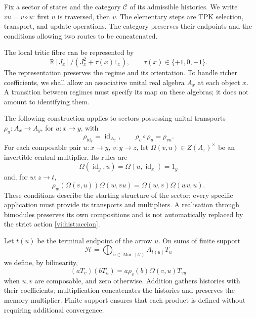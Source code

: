 Fix a sector of states and the category \(\mathcal C\) of its
admissible histories. We write \(vu=v\circ u\): first
\(u\) is traversed, then \(v\). The elementary steps are TPK
selection, transport, and update operations. The category preserves
their endpoints and the conditions allowing two routes to be concatenated.

The local tritic fibre can be represented by
\[
 \mathbb R[J_x]/(J_x^2+\tau(x)1_x),
 \qquad \tau(x)\in\{+1,0,-1\}.
\]
The representation preserves the regime and its orientation. To handle
richer coefficients, we shall allow an associative unital real
algebra \(A_x\) at each object \(x\). A transition between regimes
must specify its map on these algebras; it does not amount to identifying them.

The following construction applies to sectors possessing unital
transports \(\rho_u:A_x\to A_y\), for \(u:x\to y\), with
\begin{equation}
 \rho_{\operatorname{id}_x}=\operatorname{id}_{A_x},\qquad
 \rho_v\circ\rho_u=\rho_{vu}.
 \label{vi:hist:accion}
\end{equation}
For each composable pair \(u:x\to y\), \(v:y\to z\), let
\(\Omega(v,u)\in Z(A_z)^\times\) be an invertible central multiplier.
Its rules are
\begin{equation}
 \Omega(\operatorname{id}_y,u)
 =\Omega(u,\operatorname{id}_x)=1_y
 \label{vi:hist:normalizacion}
\end{equation}
and, for \(w:z\to t\),
\begin{equation}
 \rho_w\!\left(\Omega(v,u)\right)\Omega(w,vu)
 =\Omega(w,v)\Omega(wv,u).
 \label{vi:hist:cociclo}
\end{equation}
These conditions describe the starting structure of the sector: every
specific application must provide its transports and multipliers.
A realisation through bimodules preserves its own compositions and
is not automatically replaced by the strict action
\eqref{vi:hist:accion}.

Let \(t(u)\) be the terminal endpoint of the arrow \(u\). On sums
of finite support
\[
 \mathcal H=\bigoplus_{u\in\operatorname{Mor}(\mathcal C)}A_{t(u)}T_u
\]
we define, by bilinearity,
\begin{equation}
 (aT_v)(bT_u)=
 a\rho_v(b)\Omega(v,u)T_{vu}
 \label{vi:hist:producto}
\end{equation}
when \(u,v\) are composable, and zero otherwise. Addition gathers
histories with their coefficients; multiplication concatenates the histories and
preserves the memory multiplier. Finite support ensures that each
product is defined without requiring additional convergence.

